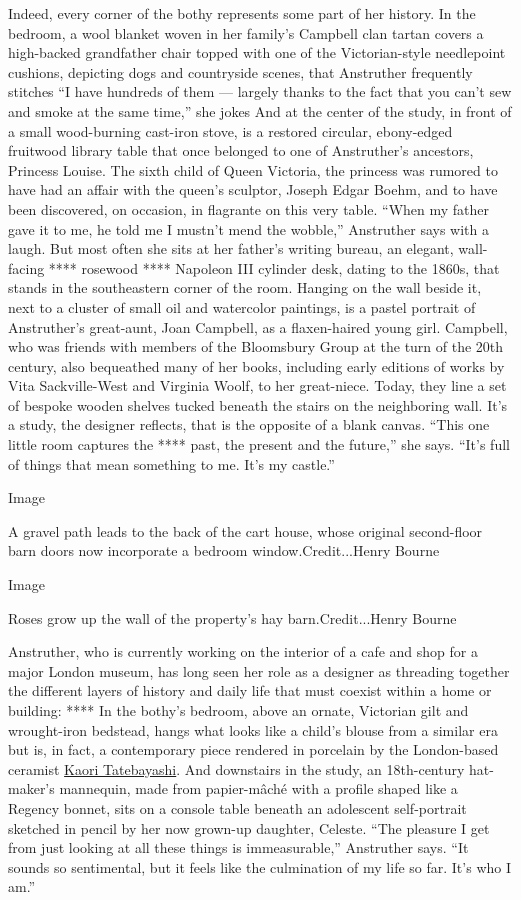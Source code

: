 Indeed, every corner of the bothy represents some part of her history.
In the bedroom, a wool blanket woven in her family's Campbell clan
tartan covers a high-backed grandfather chair topped with one of the
Victorian-style needlepoint cushions, depicting dogs and countryside
scenes, that Anstruther frequently stitches ``I have hundreds of them
--- largely thanks to the fact that you can't sew and smoke at the same
time,'' she jokes And at the center of the study, in front of a small
wood-burning cast-iron stove, is a restored circular, ebony-edged
fruitwood library table that once belonged to one of Anstruther's
ancestors, Princess Louise. The sixth child of Queen Victoria, the
princess was rumored to have had an affair with the queen's sculptor,
Joseph Edgar Boehm, and to have been discovered, on occasion, in
flagrante on this very table. ``When my father gave it to me, he told me
I mustn't mend the wobble,'' Anstruther says with a laugh. But most
often she sits at her father's writing bureau, an elegant, wall-facing
**** rosewood **** Napoleon III cylinder desk, dating to the 1860s, that
stands in the southeastern corner of the room. Hanging on the wall
beside it, next to a cluster of small oil and watercolor paintings, is a
pastel portrait of Anstruther's great-aunt, Joan Campbell, as a
flaxen-haired young girl. Campbell, who was friends with members of the
Bloomsbury Group at the turn of the 20th century, also bequeathed many
of her books, including early editions of works by Vita Sackville-West
and Virginia Woolf, to her great-niece. Today, they line a set of
bespoke wooden shelves tucked beneath the stairs on the neighboring
wall. It's a study, the designer reflects, that is the opposite of a
blank canvas. ``This one little room captures the **** past, the present
and the future,'' she says. ``It's full of things that mean something to
me. It's my castle.''

Image

A gravel path leads to the back of the cart house, whose original
second-floor barn doors now incorporate a bedroom window.Credit...Henry
Bourne

Image

Roses grow up the wall of the property's hay barn.Credit...Henry Bourne

Anstruther, who is currently working on the interior of a cafe and shop
for a major London museum, has long seen her role as a designer as
threading together the different layers of history and daily life that
must coexist within a home or building: **** In the bothy's bedroom,
above an ornate, Victorian gilt and wrought-iron bedstead, hangs what
looks like a child's blouse from a similar era but is, in fact, a
contemporary piece rendered in porcelain by the London-based ceramist
\href{http://www.kaoriceramics.com/}{Kaori Tatebayashi}. And downstairs
in the study, an 18th-century hat-maker's mannequin, made from
papier-mâché with a profile shaped like a Regency bonnet, sits on a
console table beneath an adolescent self-portrait sketched in pencil by
her now grown-up daughter, Celeste. ``The pleasure I get from just
looking at all these things is immeasurable,'' Anstruther says. ``It
sounds so sentimental, but it feels like the culmination of my life so
far. It's who I am.''

